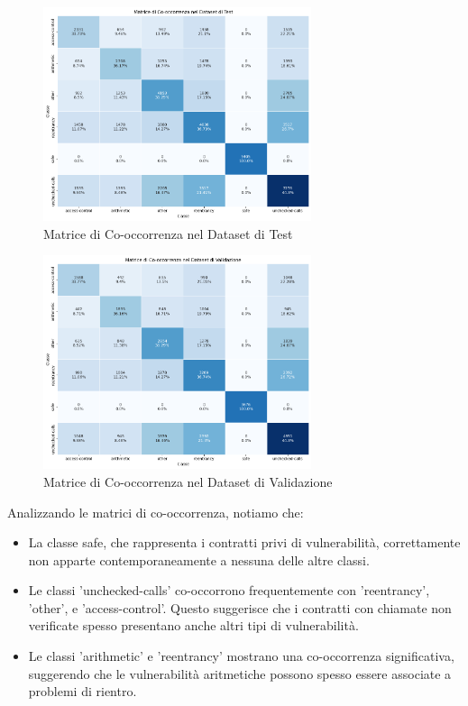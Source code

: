 \documentclass[../../Thesis.tex]{subfiles}
\begin{document}
\begin{figure}[H]
    \centering
    \includegraphics[width=0.7\textwidth]{../../img/TestCo-occurrency.png}
    \caption{Matrice di Co-occorrenza nel Dataset di Test}
    \label{fig:test_cooccurrence_matrix}
\end{figure}

\begin{figure}[h]
    \centering
    \includegraphics[width=0.7\textwidth]{../../img/ValCo-occurrency.png}
    \caption{Matrice di Co-occorrenza nel Dataset di Validazione}
    \label{fig:val_cooccurrence_matrix}
\end{figure}

Analizzando le matrici di co-occorrenza, notiamo che:

\begin{itemize}
    \item La classe safe, che rappresenta i contratti privi di vulnerabilità, correttamente non apparte contemporaneamente a nessuna delle altre classi. 
    \item Le classi 'unchecked-calls' co-occorrono frequentemente con 'reentrancy', 'other', e 'access-control'. Questo suggerisce che i contratti con chiamate non verificate spesso presentano anche altri tipi di vulnerabilità.
    \item Le classi 'arithmetic' e 'reentrancy' mostrano una co-occorrenza significativa, suggerendo che le vulnerabilità aritmetiche possono spesso essere associate a problemi di rientro.
\end{itemize}
\end{document}
